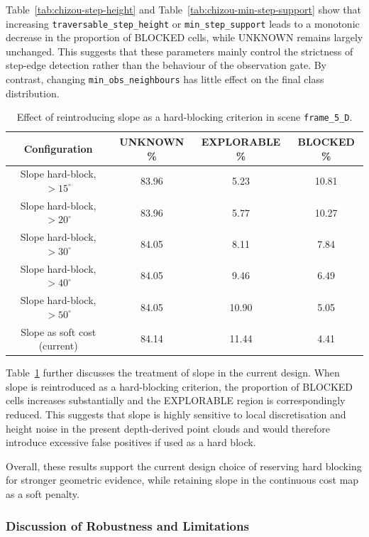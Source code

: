 \documentclass[12pt]{interim_report}
\begin{document}
Table~\ref{tab:chizou-step-height} and Table~\ref{tab:chizou-min-step-support} show that increasing \texttt{traversable\_step\_height} or \texttt{min\_step\_support} leads to a monotonic decrease in the proportion of BLOCKED cells, while UNKNOWN remains largely unchanged. This suggests that these parameters mainly control the strictness of step-edge detection rather than the behaviour of the observation gate. By contrast, changing \texttt{min\_obs\_neighbours} has little effect on the final class distribution.

\begin{table}[H]
    \centering
    \begin{tabular}{cccc}
        \toprule
        \textbf{Configuration} & \textbf{UNKNOWN \%} & \textbf{EXPLORABLE \%} & \textbf{BLOCKED \%} \\
        \midrule
        Slope hard-block, $>15^{\circ}$ & 83.96 & 5.23  & 10.81 \\
        Slope hard-block, $>20^{\circ}$ & 83.96 & 5.77  & 10.27 \\
        Slope hard-block, $>30^{\circ}$ & 84.05 & 8.11  & 7.84  \\
        Slope hard-block, $>40^{\circ}$ & 84.05 & 9.46  & 6.49  \\
        Slope hard-block, $>50^{\circ}$ & 84.05 & 10.90 & 5.05  \\
        Slope as soft cost (current)    & 84.14 & 11.44 & 4.41  \\
        \bottomrule
    \end{tabular}
    \caption{Effect of reintroducing slope as a hard-blocking criterion in scene \texttt{frame\_5\_D}.}
    \label{tab:chizou-slope-ablation}
\end{table}

Table~\ref{tab:chizou-slope-ablation} further discusses the treatment of slope in the current design. When slope is reintroduced as a hard-blocking criterion, the proportion of BLOCKED cells increases substantially and the EXPLORABLE region is correspondingly reduced. This suggests that slope is highly sensitive to local discretisation and height noise in the present depth-derived point clouds and would therefore introduce excessive false positives if used as a hard block.

Overall, these results support the current design choice of reserving hard blocking for stronger geometric evidence, while retaining slope in the continuous cost map as a soft penalty.

\subsubsection{Discussion of Robustness and Limitations}
\label{subsec:chizou-robustness-limitations}
\end{document}
